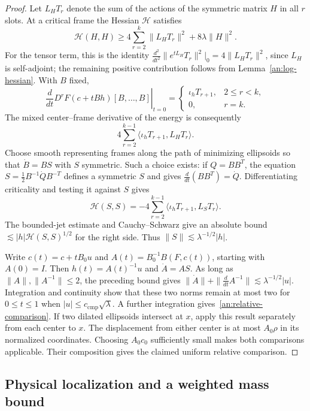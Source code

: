 \documentclass[11pt]{amsart}
\theoremstyle{definition}
\theoremstyle{remark}
\numberwithin{equation}{section}
\begin{document}
\begin{proof}
Let $L_HT_r$ denote the sum of the actions of the symmetric matrix $H$ in all $r$ slots. At a critical frame the Hessian $\mathcal H$ satisfies
\[
\mathcal H(H,H)\ge4\sum_{r=2}^k\|L_HT_r\|^2+8\lambda\|H\|^2.
\]
For the tensor term, this is the identity $\frac{d^2}{dt^2}\|e^{tL_H}T_r\|^2|_0=4\|L_HT_r\|^2$, since $L_H$ is self-adjoint; the remaining positive contribution follows from Lemma~\ref{an:log-hessian}. With $B$ fixed,
\[
\left.\frac{d}{dt}D^rF(c+tBh)[B,\ldots,B]\right|_{t=0}=\begin{cases}\iota_hT_{r+1},&2\le r<k,\\0,&r=k.\end{cases}
\]
The mixed center--frame derivative of the energy is consequently
\[
4\sum_{r=2}^{k-1}\langle\iota_hT_{r+1},L_HT_r\rangle.
\]
Choose smooth representing frames along the path of minimizing ellipsoids so that $\dot B=BS$ with $S$ symmetric. Such a choice exists: if $Q=BB^T$, the equation $S=\tfrac12B^{-1}\dot QB^{-T}$ defines a symmetric $S$ and gives $\frac{d}{dt}(BB^T)=\dot Q$. Differentiating criticality and testing it against $S$ gives
\[
\mathcal H(S,S)=-4\sum_{r=2}^{k-1}\langle\iota_hT_{r+1},L_ST_r\rangle.
\]
The bounded-jet estimate and Cauchy--Schwarz give an absolute bound $\lesssim |h|\mathcal H(S,S)^{1/2}$ for the right side. Thus $\|S\|\lesssim \lambda^{-1/2}|h|$.

Write $c(t)=c+tB_0u$ and $A(t)=B_0^{-1}B(F,c(t))$, starting with $A(0)=I$. Then $h(t)=A(t)^{-1}u$ and $\dot A=AS$. As long as $\|A\|,\|A^{-1}\|\le2$, the preceding bound gives $\|\dot A\|+\|\frac{d}{dt}A^{-1}\|\lesssim \lambda^{-1/2}|u|$. Integration and continuity show that these two norms remain at most two for $0\le t\le1$ when $|u|\le c_{\mathrm{cmp}}\sqrt\lambda$. A further integration gives~\eqref{an:relative-comparison}. If two dilated ellipsoids intersect at $x$, apply this result separately from each center to $x$. The displacement from either center is at most $A_0\rho$ in its normalized coordinates. Choosing $A_0c_0$ sufficiently small makes both comparisons applicable. Their composition gives the claimed uniform relative comparison.
\end{proof}

\subsection{Physical localization and a weighted mass bound}\label{an:physical-resource}\label{an:localization}
\end{document}
